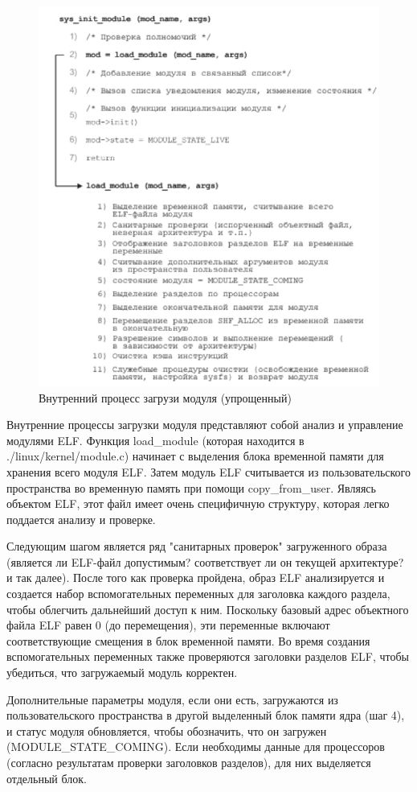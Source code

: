 \begin{figure}[H]
	\centering
	\includegraphics[width=0.7\linewidth]{src/img/sys_init_module}
	\caption{Внутренний процесс загрузи модуля (упрощенный)}
	\label{fig:sysinitmodule}
\end{figure}

Внутренние процессы загрузки модуля представляют собой анализ и управление модулями ELF. 
Функция load\_module (которая находится в ./linux/kernel/module.c) начинает с выделения блока временной памяти для хранения всего модуля ELF. 
Затем модуль ELF считывается из пользовательского пространства во временную память при помощи copy\_from\_user. 
Являясь объектом ELF, этот файл имеет очень специфичную структуру, которая легко поддается анализу и проверке.

Следующим шагом является ряд "санитарных проверок" загруженного образа (является ли ELF-файл допустимым? соответствует ли он текущей архитектуре? и так далее). 
После того как проверка пройдена, образ ELF анализируется и создается набор вспомогательных переменных для заголовка каждого раздела, чтобы облегчить дальнейший доступ к ним. 
Поскольку базовый адрес объектного файла ELF равен 0 (до перемещения), эти переменные включают соответствующие смещения в блок временной памяти. 
Во время создания вспомогательных переменных также проверяются заголовки разделов ELF, чтобы убедиться, что загружаемый модуль корректен.

Дополнительные параметры модуля, если они есть, загружаются из пользовательского пространства в другой выделенный блок памяти ядра (шаг 4), и статус модуля обновляется, чтобы обозначить, что он загружен (MODULE\_STATE\_COMING). 
Если необходимы данные для процессоров (согласно результатам проверки заголовков разделов), для них выделяется отдельный блок.

